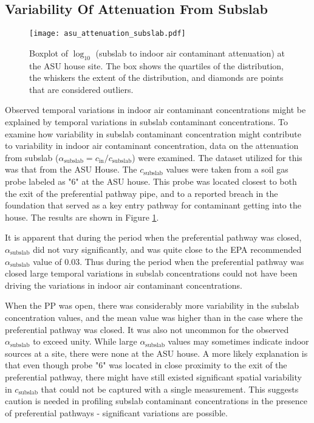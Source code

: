 \documentclass[journal=esthag,manuscript=article]{achemso}
\begin{document}
\subsection{Variability Of Attenuation From Subslab}

\begin{figure}[htb!]
 \caption{Boxplot of $\log_{10}$ (subslab to indoor air contaminant attenuation) at the ASU house site. The box shows the quartiles of the distribution, the whiskers the extent of the distribution, and diamonds are points that are considered outliers.}\label{fig:attenuation_subslab}
 \texttt{[image: asu\_attenuation\_subslab.pdf]}
\end{figure}

Observed temporal variations in indoor air contaminant concentrations might be explained by temporal variations in subslab contaminant concentrations.
To examine how variability in subslab contaminant concentration might contribute to variability in indoor air contaminant concentration, data on the attenuation from subslab ($\alpha_\mathrm{subslab} = c_\mathrm{in}/c_\mathrm{subslab}$) were examined.
The dataset utilized for this was that from the ASU House.
The $c_\mathrm{subslab}$ values were taken from a soil gas probe labeled as "6" at the ASU house.
This probe was located closest to both the exit of the preferential pathway pipe, and to a reported breach in the foundation that served as a key entry pathway for contaminant getting into the house\cite{guo_identification_2015}.
The results are shown in Figure \ref{fig:attenuation_subslab}.

It is apparent that during the period when the preferential pathway was closed, $\alpha_\mathrm{subslab}$ did not vary significantly, and was quite close to the EPA recommended $\alpha_\mathrm{subslab}$ value of 0.03\cite{u.s._environmental_protection_agency_oswer_2015}.
Thus during the period when the preferential pathway was closed large temporal variations in subslab concentrations could not have been driving the variations in indoor air contaminant concentrations.

When the PP was open, there was considerably more variability in the subslab concentration values, and the mean value was higher than in the case where the preferential pathway was closed.
It was also not uncommon for the observed $\alpha_\mathrm{subslab}$ to exceed unity.
While large $\alpha_\mathrm{subslab}$ values may sometimes indicate indoor sources at a site, there were none at the ASU house.
A more likely explanation is that even though probe "6" was located in close proximity to the exit of the preferential pathway, there might have still existed significant spatial variability in $c_\mathrm{subslab}$ that could not be captured with a single measurement.
This suggests caution is needed in profiling subslab contaminant concentrations in the presence of preferential pathways - significant variations are possible.
\end{document}
